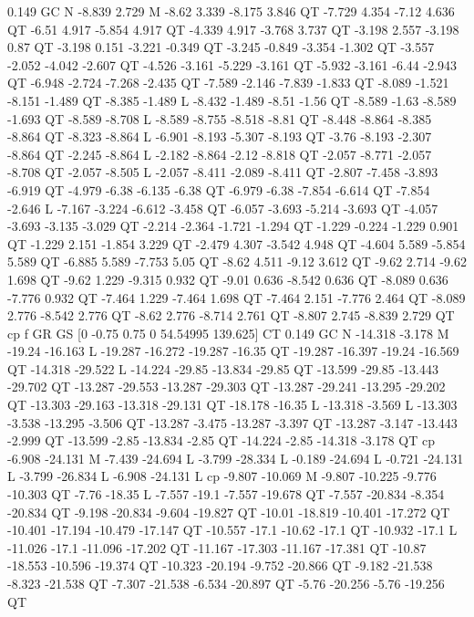 0.149 GC
N
-8.839 2.729 M
-8.62 3.339 -8.175 3.846 QT
-7.729 4.354 -7.12 4.636 QT
-6.51 4.917 -5.854 4.917 QT
-4.339 4.917 -3.768 3.737 QT
-3.198 2.557 -3.198 0.87 QT
-3.198 0.151 -3.221 -0.349 QT
-3.245 -0.849 -3.354 -1.302 QT
-3.557 -2.052 -4.042 -2.607 QT
-4.526 -3.161 -5.229 -3.161 QT
-5.932 -3.161 -6.44 -2.943 QT
-6.948 -2.724 -7.268 -2.435 QT
-7.589 -2.146 -7.839 -1.833 QT
-8.089 -1.521 -8.151 -1.489 QT
-8.385 -1.489 L
-8.432 -1.489 -8.51 -1.56 QT
-8.589 -1.63 -8.589 -1.693 QT
-8.589 -8.708 L
-8.589 -8.755 -8.518 -8.81 QT
-8.448 -8.864 -8.385 -8.864 QT
-8.323 -8.864 L
-6.901 -8.193 -5.307 -8.193 QT
-3.76 -8.193 -2.307 -8.864 QT
-2.245 -8.864 L
-2.182 -8.864 -2.12 -8.818 QT
-2.057 -8.771 -2.057 -8.708 QT
-2.057 -8.505 L
-2.057 -8.411 -2.089 -8.411 QT
-2.807 -7.458 -3.893 -6.919 QT
-4.979 -6.38 -6.135 -6.38 QT
-6.979 -6.38 -7.854 -6.614 QT
-7.854 -2.646 L
-7.167 -3.224 -6.612 -3.458 QT
-6.057 -3.693 -5.214 -3.693 QT
-4.057 -3.693 -3.135 -3.029 QT
-2.214 -2.364 -1.721 -1.294 QT
-1.229 -0.224 -1.229 0.901 QT
-1.229 2.151 -1.854 3.229 QT
-2.479 4.307 -3.542 4.948 QT
-4.604 5.589 -5.854 5.589 QT
-6.885 5.589 -7.753 5.05 QT
-8.62 4.511 -9.12 3.612 QT
-9.62 2.714 -9.62 1.698 QT
-9.62 1.229 -9.315 0.932 QT
-9.01 0.636 -8.542 0.636 QT
-8.089 0.636 -7.776 0.932 QT
-7.464 1.229 -7.464 1.698 QT
-7.464 2.151 -7.776 2.464 QT
-8.089 2.776 -8.542 2.776 QT
-8.62 2.776 -8.714 2.761 QT
-8.807 2.745 -8.839 2.729 QT
cp
f
GR
GS
[0 -0.75 0.75 0 54.54995 139.625] CT
0.149 GC
N
-14.318 -3.178 M
-19.24 -16.163 L
-19.287 -16.272 -19.287 -16.35 QT
-19.287 -16.397 -19.24 -16.569 QT
-14.318 -29.522 L
-14.224 -29.85 -13.834 -29.85 QT
-13.599 -29.85 -13.443 -29.702 QT
-13.287 -29.553 -13.287 -29.303 QT
-13.287 -29.241 -13.295 -29.202 QT
-13.303 -29.163 -13.318 -29.131 QT
-18.178 -16.35 L
-13.318 -3.569 L
-13.303 -3.538 -13.295 -3.506 QT
-13.287 -3.475 -13.287 -3.397 QT
-13.287 -3.147 -13.443 -2.999 QT
-13.599 -2.85 -13.834 -2.85 QT
-14.224 -2.85 -14.318 -3.178 QT
cp
-6.908 -24.131 M
-7.439 -24.694 L
-3.799 -28.334 L
-0.189 -24.694 L
-0.721 -24.131 L
-3.799 -26.834 L
-6.908 -24.131 L
cp
-9.807 -10.069 M
-9.807 -10.225 -9.776 -10.303 QT
-7.76 -18.35 L
-7.557 -19.1 -7.557 -19.678 QT
-7.557 -20.834 -8.354 -20.834 QT
-9.198 -20.834 -9.604 -19.827 QT
-10.01 -18.819 -10.401 -17.272 QT
-10.401 -17.194 -10.479 -17.147 QT
-10.557 -17.1 -10.62 -17.1 QT
-10.932 -17.1 L
-11.026 -17.1 -11.096 -17.202 QT
-11.167 -17.303 -11.167 -17.381 QT
-10.87 -18.553 -10.596 -19.374 QT
-10.323 -20.194 -9.752 -20.866 QT
-9.182 -21.538 -8.323 -21.538 QT
-7.307 -21.538 -6.534 -20.897 QT
-5.76 -20.256 -5.76 -19.256 QT
